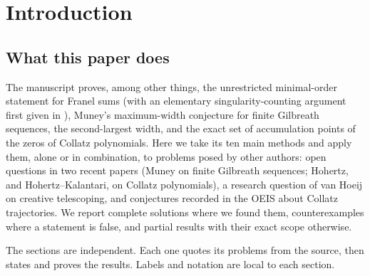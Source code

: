 \documentclass[11pt,a4paper]{article}
\theoremstyle{definition}
\theoremstyle{remark}
\numberwithin{equation}{section}
\begin{document}
\section{Introduction}\label{B:sec:intro}

\subsection{What this paper does}
The manuscript \cite{R021} proves, among other things, the unrestricted
minimal-order statement for Franel sums (with an elementary singularity-counting
argument first given in \cite{R019}), Muney's maximum-width conjecture for
finite Gilbreath sequences, the second-largest width, and the exact set of
accumulation points of the zeros of Collatz polynomials. Here we take its ten
main methods and apply them, alone or in combination, to problems posed by
other authors: open questions in two recent papers (Muney on finite Gilbreath
sequences; Hohertz, and Hohertz--Kalantari, on Collatz polynomials), a research
question of van Hoeij on creative telescoping, and conjectures recorded in the
OEIS about Collatz trajectories. We report complete solutions where we found
them, counterexamples where a statement is false, and partial results with
their exact scope otherwise.

The sections are independent. Each one quotes its problems from the source,
then states and proves the results. Labels and notation are local to each
section.
\end{document}
